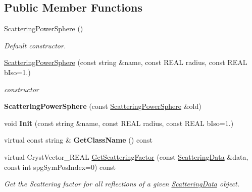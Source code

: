 \subsection*{Public Member Functions}
\begin{DoxyCompactItemize}
\item 
\mbox{\label{class_obj_cryst_1_1_scattering_power_sphere_a2d28cd4a75be9b4f9f784329ed2401d6}} 
\mbox{\hyperlink{class_obj_cryst_1_1_scattering_power_sphere_a2d28cd4a75be9b4f9f784329ed2401d6}{Scattering\+Power\+Sphere}} ()
\begin{DoxyCompactList}\small\item\em Default constructor. \end{DoxyCompactList}\item 
\mbox{\hyperlink{class_obj_cryst_1_1_scattering_power_sphere_a2d50cba1b4405f52f1dd4148907a88c5}{Scattering\+Power\+Sphere}} (const string \&name, const R\+E\+AL radius, const R\+E\+AL b\+Iso=1.)
\begin{DoxyCompactList}\small\item\em constructor \end{DoxyCompactList}\item 
\mbox{\label{class_obj_cryst_1_1_scattering_power_sphere_ad5b2d4703250ae10fb27f8929a904d47}} 
{\bfseries Scattering\+Power\+Sphere} (const \mbox{\hyperlink{class_obj_cryst_1_1_scattering_power_sphere}{Scattering\+Power\+Sphere}} \&old)
\item 
\mbox{\label{class_obj_cryst_1_1_scattering_power_sphere_aa6795f9a244597425863c410e40153f5}} 
void {\bfseries Init} (const string \&name, const R\+E\+AL radius, const R\+E\+AL b\+Iso=1.)
\item 
\mbox{\label{class_obj_cryst_1_1_scattering_power_sphere_afa48701ad43487e2788efd1ed8749228}} 
virtual const string \& {\bfseries Get\+Class\+Name} () const
\item 
virtual Cryst\+Vector\+\_\+\+R\+E\+AL \mbox{\hyperlink{class_obj_cryst_1_1_scattering_power_sphere_aad2a92da56fe7e50e585a0ad24da5c83}{Get\+Scattering\+Factor}} (const \mbox{\hyperlink{class_obj_cryst_1_1_scattering_data}{Scattering\+Data}} \&data, const int spg\+Sym\+Pos\+Index=0) const
\begin{DoxyCompactList}\small\item\em Get the Scattering factor for all reflections of a given \mbox{\hyperlink{class_obj_cryst_1_1_scattering_data}{Scattering\+Data}} object. \end{DoxyCompactList}\item 

\end{DoxyCompactItemize}
